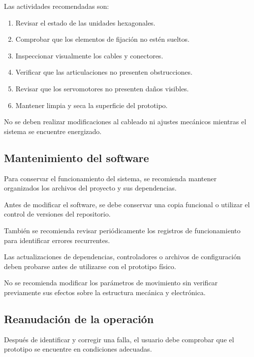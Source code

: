 \documentclass[letterpaper,journal]{IEEEtran}
\begin{document}
Las actividades recomendadas son:

\begin{enumerate}
    \item Revisar el estado de
    las unidades hexagonales.

    \item Comprobar que los elementos
    de fijación no estén sueltos.

    \item Inspeccionar visualmente
    los cables y conectores.

    \item Verificar que las
    articulaciones no presenten
    obstrucciones.

    \item Revisar que los
    servomotores no presenten
    daños visibles.

    \item Mantener limpia y seca
    la superficie del prototipo.
\end{enumerate}

No se deben realizar modificaciones
al cableado ni ajustes mecánicos
mientras el sistema se encuentre
energizado.

\subsection{Mantenimiento del software}

Para conservar el funcionamiento
del sistema, se recomienda mantener
organizados los archivos del proyecto
y sus dependencias.

Antes de modificar el software,
se debe conservar una copia funcional
o utilizar el control de versiones
del repositorio.

También se recomienda revisar
periódicamente los registros
de funcionamiento para identificar
errores recurrentes.

Las actualizaciones de dependencias,
controladores o archivos de configuración
deben probarse antes de utilizarse
con el prototipo físico.

No se recomienda modificar los
parámetros de movimiento sin verificar
previamente sus efectos sobre
la estructura mecánica y electrónica.

\subsection{Reanudación de la operación}

Después de identificar y corregir
una falla, el usuario debe comprobar
que el prototipo se encuentre
en condiciones adecuadas.
\end{document}
